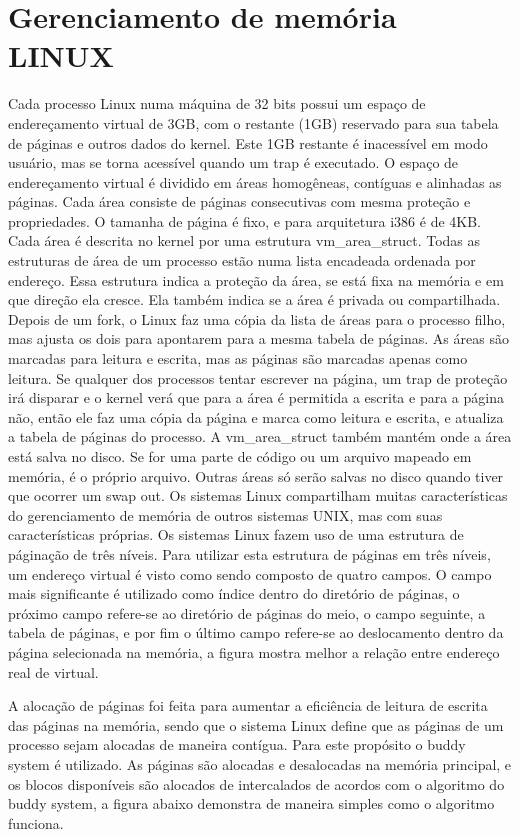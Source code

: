 \section{Gerenciamento de memória LINUX}
Cada processo Linux numa máquina de 32 bits possui um espaço de endereçamento virtual de 3GB, com o restante (1GB) reservado para sua tabela de páginas e outros dados do kernel. Este 1GB restante é inacessível em modo usuário, mas se torna acessível quando um trap é executado.
O espaço de endereçamento virtual é dividido em áreas homogêneas, contíguas e alinhadas as páginas. Cada área consiste de páginas consecutivas com mesma proteção e propriedades. O tamanha de página é fixo, e para arquitetura i386 é de 4KB.
Cada área é descrita no kernel por uma estrutura vm_area_struct. Todas as estruturas de área de um processo estão numa lista encadeada ordenada por endereço. Essa estrutura indica a proteção da área, se está fixa na memória e em que direção ela cresce. Ela também indica se a área é privada ou compartilhada.
Depois de um fork, o Linux faz uma cópia da lista de áreas para o processo filho, mas ajusta os dois para apontarem para a mesma tabela de páginas. As áreas são marcadas para leitura e escrita, mas as páginas são marcadas apenas como leitura. Se qualquer dos processos tentar escrever na página, um trap de proteção irá disparar e o kernel verá que para a área é permitida a escrita e para a página não, então ele faz uma cópia da página e marca como leitura e escrita, e atualiza a tabela de páginas do processo.
A vm_area_struct também mantém onde a área está salva no disco. Se for uma parte de código ou um arquivo mapeado em memória, é o próprio arquivo. Outras áreas só serão salvas no disco quando tiver que ocorrer um swap out.
Os sistemas Linux compartilham muitas características do gerenciamento de memória de outros sistemas UNIX, mas com suas características próprias. Os sistemas Linux fazem uso de uma estrutura de páginação de três níveis.
Para utilizar esta estrutura de páginas em três níveis, um endereço virtual é visto como sendo composto de quatro campos. O campo mais significante é utilizado como índice dentro do diretório de páginas, o próximo campo refere-se ao diretório de páginas do meio, o campo seguinte, a tabela de páginas, e por fim o último campo refere-se ao deslocamento dentro da página selecionada na memória, a figura mostra melhor a relação entre endereço real de virtual.

A alocação de páginas foi feita para aumentar a eficiência de leitura de escrita das páginas na memória, sendo que o sistema Linux define que as páginas de um processo sejam alocadas de maneira contígua. Para este propósito o buddy system é utilizado. As páginas são alocadas e desalocadas na memória principal, e os blocos disponíveis são alocados de intercalados de acordos com o algoritmo do buddy system, a figura abaixo demonstra de maneira simples como o algoritmo funciona.

